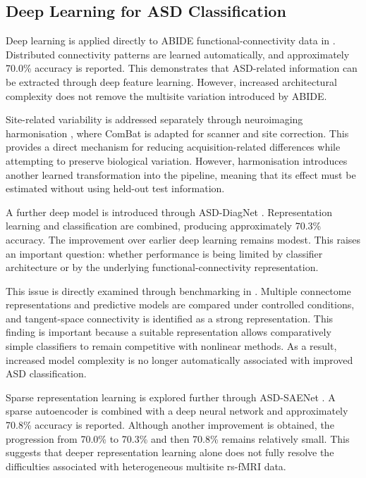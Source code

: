 \documentclass[a4paper,fleqn]{cas-sc}
\begin{document}
\subsection{Deep Learning for ASD Classification}

Deep learning is applied directly to ABIDE functional-connectivity data in \cite{Heinsfeldetal2018}. Distributed connectivity patterns are learned automatically, and approximately 70.0\% accuracy is reported. This demonstrates that ASD-related information can be extracted through deep feature learning. However, increased architectural complexity does not remove the multisite variation introduced by ABIDE.

Site-related variability is addressed separately through neuroimaging harmonisation \cite{Fortinetal2018}, where ComBat is adapted for scanner and site correction. This provides a direct mechanism for reducing acquisition-related differences while attempting to preserve biological variation. However, harmonisation introduces another learned transformation into the pipeline, meaning that its effect must be estimated without using held-out test information.

A further deep model is introduced through ASD-DiagNet \cite{Eslamietal2019}. Representation learning and classification are combined, producing approximately 70.3\% accuracy. The improvement over earlier deep learning remains modest. This raises an important question: whether performance is being limited by classifier architecture or by the underlying functional-connectivity representation.

This issue is directly examined through benchmarking in \cite{Dadietal2019}. Multiple connectome representations and predictive models are compared under controlled conditions, and tangent-space connectivity is identified as a strong representation. This finding is important because a suitable representation allows comparatively simple classifiers to remain competitive with nonlinear methods. As a result, increased model complexity is no longer automatically associated with improved ASD classification.

Sparse representation learning is explored further through ASD-SAENet \cite{AlmuqhimSaeed2021}. A sparse autoencoder is combined with a deep neural network and approximately 70.8\% accuracy is reported. Although another improvement is obtained, the progression from 70.0\% to 70.3\% and then 70.8\% remains relatively small. This suggests that deeper representation learning alone does not fully resolve the difficulties associated with heterogeneous multisite rs-fMRI data.
\end{document}
